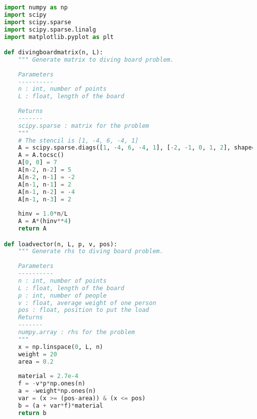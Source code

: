 \begin{lstlisting}[language=python]
import numpy as np
import scipy
import scipy.sparse  
import scipy.sparse.linalg  
import matplotlib.pyplot as plt

def divingboardmatrix(n, L):
    """ Generate matrix to diving board problem.
    
    Parameters
    ----------
    n : int, number of points 
    L : float, length of the board
        
    Returns
    -------
    scipy.sparse : matrix for the problem
    """
    # The stencil is [1, -4, 6, -4, 1]
    A = scipy.sparse.diags([1, -4, 6, -4, 1], [-2, -1, 0, 1, 2], shape=(n, n))
    A = A.tocsc()
    A[0, 0] = 7
    A[n-2, n-2] = 5
    A[n-2, n-1] = -2
    A[n-1, n-1] = 2
    A[n-1, n-2] = -4
    A[n-1, n-3] = 2
    
    hinv = 1.0*n/L
    A = A*(hinv**4)
    return A

def loadvector(n, L, p, v, pos):
    """ Generate rhs to diving board problem.
    
    Parameters
    ----------
    n : int, number of points 
    L : float, length of the board
    p : int, number of people
    v : float, average weight of one person
    pos : float, position to put the load
    Returns
    -------
    numpy.array : rhs for the problem
    """
    x = np.linspace(0, L, n)
    weight = 20
    area = 0.2
    
    material = 2.7e-4
    f = -v*p*np.ones(n)
    a = -weight*np.ones(n)
    var = (x >= (pos-area)) & (x <= pos)
    b = (a + var*f)*material
    return b
\end{lstlisting}









